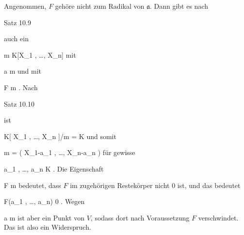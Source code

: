 {





Angenommen, $F$ gehöre nicht zum Radikal von ${\mathfrak a}$. Dann gibt es nach

Satz 10.9

auch ein

\mavergleichskette
{\vergleichskette
{ {\mathfrak m}
}
{ \subset }{ K[X_1 , \ldots , X_n]
}
{  }{
}
{    }{
}
{   }{
}
}
{}{}{}
mit

\mavergleichskette
{\vergleichskette
{ {\mathfrak a}
}
{ \subseteq }{ {\mathfrak m}
}
{  }{
}
{    }{
}
{   }{
}
}
{}{}{}
und mit

\mavergleichskette
{\vergleichskette
{ F
}
{ \notin }{ {\mathfrak m}
}
{  }{
}
{    }{
}
{   }{
}
}
{}{}{.}
Nach

Satz 10.10

ist

\mavergleichskette
{\vergleichskette
{ K[ X_1 , \ldots ,  X_n ]/{\mathfrak m}
}
{ = }{ K
}
{  }{
}
{    }{
}
{   }{
}
}
{}{}{}
und somit

\mavergleichskettedisp
{\vergleichskette
{ {\mathfrak m}
}
{ =} { \left(  X_1-a_1 , \ldots ,  X_n-a_n  \right)
}
{ } {
}
{ } {
}
{ } {
}
}
{}{}{}
für gewisse

\mavergleichskette
{\vergleichskette
{ a_1 , \ldots ,  a_n
}
{ \in }{ K
}
{  }{
}
{    }{
}
{   }{
}
}
{}{}{.}
Die Eigenschaft

\mavergleichskette
{\vergleichskette
{ F
}
{ \notin }{ {\mathfrak m}
}
{  }{
}
{    }{
}
{   }{
}
}
{}{}{}
bedeutet, dass $F$ im zugehörigen Restekörper nicht $0$ ist, und das bedeutet

\mavergleichskette
{\vergleichskette
{ F(a_1 , \ldots ,  a_n)
}
{ \neq }{ 0
}
{  }{
}
{    }{
}
{   }{
}
}
{}{}{.}
Wegen

\mavergleichskette
{\vergleichskette
{ {\mathfrak a}
}
{ \subseteq }{ {\mathfrak m}
}
{  }{
}
{    }{
}
{   }{
}
}
{}{}{}
ist aber
 ein Punkt von $V$, sodass dort nach Voraussetzung $F$ verschwindet. Das ist also ein Widerspruch.




}






